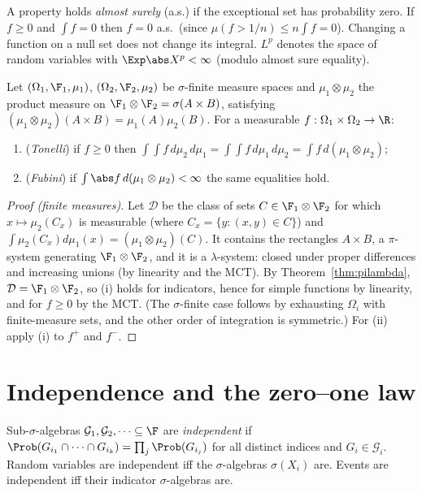 \begin{definition}
A property holds \emph{almost surely} (a.s.) if the exceptional set has probability zero.
If $f\ge0$ and $\int f=0$ then $f=0$ a.s.\ (since $\mu(f>1/n)\le n\int f=0$). Changing a
function on a null set does not change its integral. $L^p$ denotes the space of random
variables with $\Exp\abs X^p<\infty$ (modulo almost sure equality).
\end{definition}

\begin{theorem}\label{thm:fubini}
Let $(\Omega_1,\F_1,\mu_1)$, $(\Omega_2,\F_2,\mu_2)$ be $\sigma$-finite measure spaces and
$\mu_1\otimes\mu_2$ the product measure on $\F_1\otimes\F_2=\sigma(A\times B)$, satisfying
$(\mu_1\otimes\mu_2)(A\times B)=\mu_1(A)\mu_2(B)$. For a measurable $f:\Omega_1\times\Omega_2\to\R$:
\begin{enumerate}[label=(\roman*)]
\item (\emph{Tonelli}) if $f\ge0$ then $\int\!\!\int f\,d\mu_2\,d\mu_1=\int\!\!\int f\,d\mu_1\,d\mu_2=\int f\,d(\mu_1\otimes\mu_2)$;
\item (\emph{Fubini}) if $\int\abs f\,d(\mu_1\otimes\mu_2)<\infty$ the same equalities hold.
\end{enumerate}
\end{theorem}
\begin{proof}[Proof (finite measures)]
Let $\mathcal D$ be the class of sets $C\in\F_1\otimes\F_2$ for which $x\mapsto\mu_2(C_x)$ is
measurable (where $C_x=\{y:(x,y)\in C\}$) and $\int\mu_2(C_x)d\mu_1(x)=(\mu_1\otimes\mu_2)(C)$.
It contains the rectangles $A\times B$, a $\pi$-system generating $\F_1\otimes\F_2$, and it is
a $\lambda$-system: closed under proper differences and increasing unions (by linearity and
the MCT). By Theorem~\ref{thm:pilambda}, $\mathcal D=\F_1\otimes\F_2$, so (i) holds for
indicators, hence for simple functions by linearity, and for $f\ge0$ by the MCT. (The
$\sigma$-finite case follows by exhausting $\Omega_i$ with finite-measure sets, and the
other order of integration is symmetric.) For (ii) apply (i) to $f^+$ and $f^-$.
\end{proof}

\section{Independence and the zero--one law}

\begin{definition}
Sub-$\sigma$-algebras $\mathcal G_1,\mathcal G_2,\dots\subseteq\F$ are \emph{independent} if
$\Prob(G_{i_1}\cap\dots\cap G_{i_k})=\prod_j\Prob(G_{i_j})$ for all distinct indices and
$G_i\in\mathcal G_i$. Random variables are independent iff the $\sigma$-algebras
$\sigma(X_i)$ are. Events are independent iff their indicator $\sigma$-algebras are.
\end{definition}

